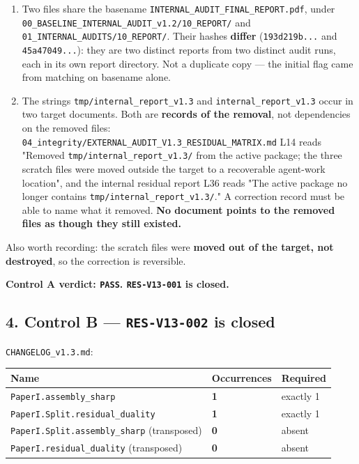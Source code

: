 \documentclass[
  9pt,
  a4paper,
]{article}
\newcounter{none} %
\providecommand{\tightlist}{%
  \setlength{\itemsep}{0pt}\setlength{\parskip}{0pt}}
\begin{document}
\begin{enumerate}
\def\labelenumi{\arabic{enumi}.}
\tightlist
\item
  Two files share the basename
  \texttt{INTERNAL\_AUDIT\_FINAL\_REPORT.pdf}, under
  \texttt{00\_BASELINE\_INTERNAL\_AUDIT\_v1.2/10\_REPORT/} and
  \texttt{01\_INTERNAL\_AUDITS/10\_REPORT/}. Their hashes
  \textbf{differ} (\texttt{193d219b...} and \texttt{45a47049...}): they
  are two distinct reports from two distinct audit runs, each in its own
  report directory. Not a duplicate copy --- the initial flag came from
  matching on basename alone.
\item
  The strings \texttt{tmp/internal\_report\_v1.3} and
  \texttt{internal\_report\_v1.3} occur in two target documents. Both
  are \textbf{records of the removal}, not dependencies on the removed
  files:
  \texttt{04\_integrity/EXTERNAL\_AUDIT\_V1.3\_RESIDUAL\_MATRIX.md} L14
  reads "Removed \texttt{tmp/internal\_report\_v1.3/} from the active
  package; the three scratch files were moved outside the target to a
  recoverable agent-work location", and the internal residual report L36
  reads "The active package no longer contains
  \texttt{tmp/internal\_report\_v1.3/}." A correction record must be
  able to name what it removed. \textbf{No document points to the
  removed files as though they still existed.}
\end{enumerate}

Also worth recording: the scratch files were \textbf{moved out of the
target, not destroyed}, so the correction is reversible.

\textbf{Control A verdict: \texttt{PASS}. \texttt{RES-V13-001} is
closed.}

\subsection{\texorpdfstring{4. Control B --- \texttt{RES-V13-002} is
closed}{4. Control B --- RES-V13-002 is closed}}\label{4-control-b--res-v13-002-is-closed}

\texttt{CHANGELOG\_v1.3.md}:

{\def\LTcaptype{none} %
\begin{longtable}[]{@{}lll@{}}
\toprule\noalign{}
Name & Occurrences & Required \\
\midrule\noalign{}
\endhead
\bottomrule\noalign{}
\endlastfoot
\texttt{PaperI.assembly\_sharp} & \textbf{1} & exactly 1 \\
\texttt{PaperI.Split.residual\_duality} & \textbf{1} & exactly 1 \\
\texttt{PaperI.Split.assembly\_sharp} (transposed) & \textbf{0} &
absent \\
\texttt{PaperI.residual\_duality} (transposed) & \textbf{0} & absent \\
\end{longtable}
}
\end{document}
